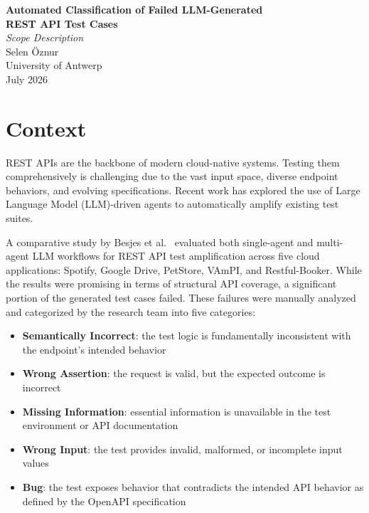 \documentclass[12pt, a4paper]{article}
\begin{document}
\begin{center}
    {\Large \textbf{Automated Classification of Failed LLM-Generated\\[4pt] REST API Test Cases}}\\[10pt]
    {\normalsize \textit{Scope Description }}\\[6pt]
    {\normalsize Selen Öznur}\\[4pt]
    {\normalsize University of Antwerp}\\[4pt]
    {\normalsize July 2026}
\end{center}

\vspace{1em}

\section{Context}
REST APIs are the backbone of modern cloud-native systems. Testing them
comprehensively is challenging due to the vast input space, diverse endpoint
behaviors, and evolving specifications. Recent work has explored the use of
Large Language Model (LLM)-driven agents to automatically amplify existing
test suites.

A comparative study by Besjes et al.~\cite{besjes2025agentic}
evaluated both single-agent and multi-agent LLM workflows for REST API
test amplification across five cloud applications: Spotify, Google Drive,
PetStore, VAmPI, and Restful-Booker. While the results were promising
in terms of structural API coverage, a significant portion of the
generated test cases failed. These failures were manually analyzed and
categorized by the research team into five categories:

\begin{itemize}[leftmargin=1.5em, itemsep=3pt]
    \item \textbf{Semantically Incorrect}: the test logic is fundamentally inconsistent with the endpoint's intended behavior
    \item \textbf{Wrong Assertion}: the request is valid, but the expected outcome is incorrect
    \item \textbf{Missing Information}: essential information is unavailable in the test environment or API documentation
    \item \textbf{Wrong Input}: the test provides invalid, malformed, or incomplete input values
    \item \textbf{Bug}: the test exposes behavior that contradicts the intended API behavior as defined by the OpenAPI specification
\end{itemize}
\end{document}
